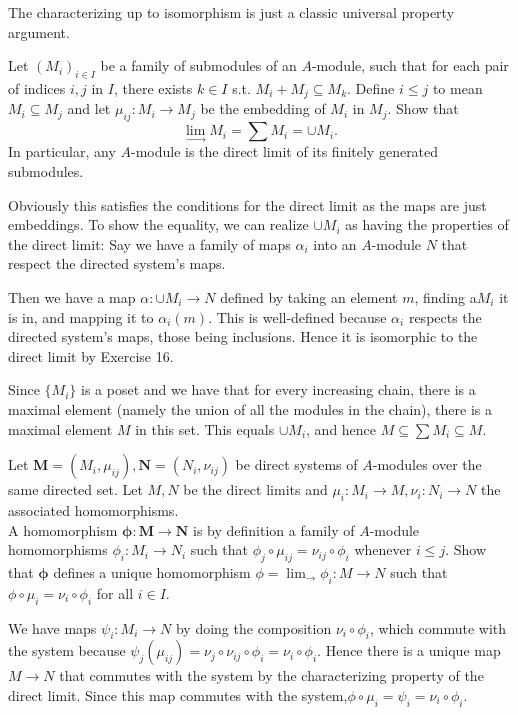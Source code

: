 \documentclass[a4paper]{exam}
\begin{document}
\begin{questions}
\begin{solution}
		The characterizing up to isomorphism is just a classic universal property argument.
	\end{solution}

	\question Let $(M_i)_{i\in I}$ be a family of submodules of an $A$-module, such that for each pair of indices $i,j$ in $I $, there exists $k\in I$ s.t. $M_i + M_j \subseteq M_k$. Define $i\le j$ to mean $M_i \subseteq M_j$ and let $\mu _{ij}: M_i\to M_j$ be the embedding of $M_i$ in $M_j$. Show that
	\[
		\lim_{\rightarrow} M_i = \sum M_i = \cup M_i
	.\]
	In particular, any $A$-module is the direct limit of its finitely generated submodules.
	\begin{solution}
		Obviously this satisfies the conditions for the direct limit as the maps are just embeddings.
		To show the equality, we can realize $\cup M_i$ as having the properties of the direct limit:
		Say we have a family of maps $\alpha _i$ into an $A$-module $N$ that respect the directed system's maps.

		Then we have a map $\alpha :\cup M_i \to N$ defined by taking an element $m $, finding a$ M_i$ it is in, and mapping it to $\alpha _i(m)$.
		This is well-defined because $\alpha _i$ respects the directed system's maps, those being inclusions.
		Hence it is isomorphic to the direct limit by Exercise 16.

		Since $\{M_i\}$ is a poset and we have that for every increasing chain, there is a maximal element (namely the union of all the modules in the chain), there is a maximal element $M$ in this set.
		This equals $\cup M_i $, and hence $M \subseteq \sum M_i \subseteq M$.
	\end{solution}

	\question Let $\bm{M} = (M_i, \mu_{ij}), \bm{N}=(N_i,\nu_{ij})$ be direct systems of $A$-modules over the same directed set. Let $M,N$ be the direct limits and $\mu _i: M_i\to M , \nu_i: N_i \to N$ the associated homomorphisms.\\
	A homomorphism $\bm{\phi}:\bm{M}\to \bm{N}$ is by definition a family of $A$-module homomorphisms $\phi_i:M_i\to N_i$ such that $\phi _j \circ \mu_{ij}=\nu_{ij}\circ \phi_i$ whenever $i\le j$. Show that $\bm{\phi}$ defines a unique homomorphism $\phi = \lim_{\rightarrow} \phi_i: M\to N$ such that $\phi\circ \mu_i = \nu_i\circ \phi_i$ for all $i\in I$.
	\begin{solution}
		We have maps $\psi_i: M_i\to N$ by doing the composition $\nu_i\circ \phi_i $, which commute with the system because $\psi_j(\mu_{ij}) = \nu_j\circ \nu_{ij}\circ \phi_i = \nu_i\circ \phi_i$.
		Hence there is a unique map $M\to N$ that commutes with the system by the characterizing property of the direct limit.
		Since this map commutes with the system,$\phi\circ \mu_i = \psi_i = \nu_i \circ \phi_i$.
	\end{solution}


\end{questions}
\end{document}
